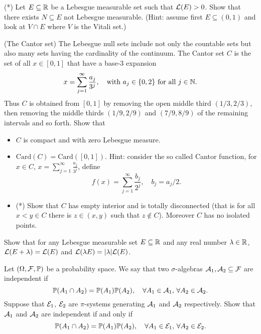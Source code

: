 \begin{problem}(*) Let $E\subseteq \mathbb R$ be a Lebesgue measurable set such that $\mathcal L(E)>0$. Show that there exists $N\subseteq E$ not Lebesgue measurable. (Hint: assume first $E\subseteq (0,1)$ and look at $V\cap E$ where $V$ is the Vitali set.) 
    \end{problem}
    
\begin{problem}(The Cantor set) The Lebesgue null sets include not only the countable sets but also many sets having the cardinality of the continuum. The Cantor set $C$ is the set of all $x \in [0, 1]$ that have a base-$3$ expansion
        \begin{equation*}
            x = \sum_{j=1}^\infty \frac{a_j}{3^j},\quad \text{with $a_j\in\{0,2\}$ for all $j\in \mathbb N$.}
        \end{equation*} 
        Thus $C$ is obtained from $[0,1]$ by removing the open middle third $(1/3,2/3)$, then removing the middle thirds $(1/9,2/9)$ and $(7/9,8/9)$ of the remaining intervals and so forth.
        Show that 
        \begin{itemize}
            \item $C$ is compact and with zero Lebesgue measure.
            \item $\mathrm{Card}(C) = \mathrm{Card}([0,1])$. Hint: consider the so called Cantor function, for $x\in C$, $x=\sum_{j=1}^\infty \frac{a_j}{3^j}$, define
            \begin{equation*}
                f(x) =\sum_{j=1}^\infty \frac{b_j}{2^j},\quad b_j=a_j/2.
            \end{equation*}
            \item (*) Show that $C$ has empty interior and is totally disconnected (that is for all $x<y\in C$ there is $z\in(x,y)$ such that $z\notin C$). Moreover $C$ has no isolated points.
\end{itemize}
\end{problem}
        

\begin{problem}
    Show that for any Lebesgue measurable set $E\subseteq \mathbb R$ and any real number $\lambda\in \mathbb R$, $\mathcal L(E+\lambda) = \mathcal L(E)$ and $\mathcal L(\lambda E) = |\lambda| \mathcal L(E)$.
\end{problem}

\begin{problem}
    Let $(\Omega,\mathcal F,\mathbb P)$ be a probability space. We say that two $\sigma$-algebras $\mathcal A_1, \mathcal A_2\subseteq \mathcal F$ are independent if
    \begin{equation*}
        \mathbb P(A_1\cap A_2) = \mathbb P(A_1)\mathbb P(A_2),\quad \forall A_1\in\mathcal A_1,\,\forall A_2\in \mathcal A_2.
    \end{equation*}
    Suppose that $\mathcal E_1$, $\mathcal E_2$ are $\pi$-systems generating $\mathcal A_1$ and $\mathcal A_2$ respectively. Show that $\mathcal A_1$ and $\mathcal A_2$ are independent if and only if
    \begin{equation*}
        \mathbb P(A_1\cap A_2) = \mathbb P(A_1)\mathbb P(A_2),\quad \forall A_1\in\mathcal E_1,\,\forall A_2\in \mathcal E_2.
    \end{equation*} 
\end{problem}

